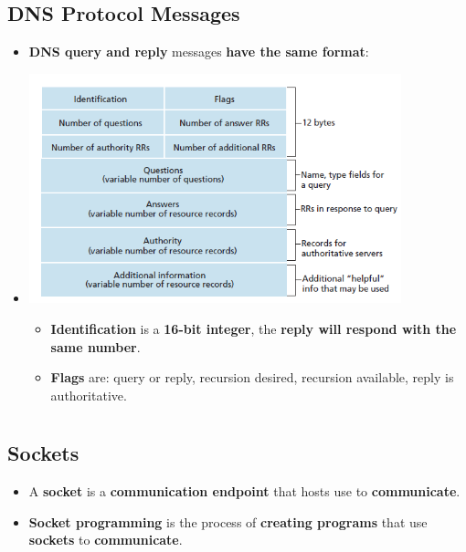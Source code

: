\documentclass{article}
\begin{document}
    \subsection*{DNS Protocol Messages}
    \begin{itemize}
        \item \textbf{DNS query and reply} messages \textbf{have the same format}:
        \item[] \includegraphics[width=407px]{images/DNS-Message.png}
        \begin{itemize}
            \item \textbf{Identification} is a \textbf{16-bit integer}, the \textbf{reply will respond with the same number}.
            \item \textbf{Flags} are: query or reply, recursion desired, recursion available, reply is authoritative.
        \end{itemize}        
    \end{itemize}

    \section*{}

    \subsection*{Sockets}
    \begin{itemize}
        \item A \textbf{socket} is a \textbf{communication endpoint} that hosts use to \textbf{communicate}.
        \item \textbf{Socket programming} is the process of \textbf{creating programs} that use \textbf{sockets} to \textbf{communicate}.
    \end{itemize}
\end{document}
